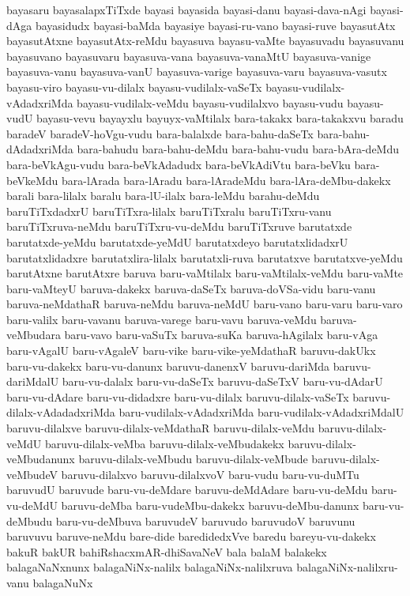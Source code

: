 {bayasaru
bayasalapxTiTxde
bayasi
bayasida
bayasi-danu
bayasi-dava-nAgi
bayasi-dAga
bayasidudx
bayasi-baMda
bayasiye
bayasi-ru-vano
bayasi-ruve
bayasutAtx
bayasutAtxne
bayasutAtx-reMdu
bayasuva
bayasu-vaMte
bayasuvadu
bayasuvanu
bayasuvano
bayasuvaru
bayasuva-vana
bayasuva-vanaMtU
bayasuva-vanige
bayasuva-vanu
bayasuva-vanU
bayasuva-varige
bayasuva-varu
bayasuva-vasutx
bayasu-viro
bayasu-vu-dilalx
bayasu-vudilalx-vaSeTx
bayasu-vudilalx-vAdadxriMda
bayasu-vudilalx-veMdu
bayasu-vudilalxvo
bayasu-vudu
bayasu-vudU
bayasu-vevu
bayayxlu
bayuyx-vaMtilalx
bara-takakx
bara-takakxvu
baradu
baradeV
baradeV-hoVgu-vudu
bara-balalxde
bara-bahu-daSeTx
bara-bahu-dAdadxriMda
bara-bahudu
bara-bahu-deMdu
bara-bahu-vudu
bara-bAra-deMdu
bara-beVkAgu-vudu
bara-beVkAdadudx
bara-beVkAdiVtu
bara-beVku
bara-beVkeMdu
bara-lArada
bara-lAradu
bara-lAradeMdu
bara-lAra-deMbu-dakekx
barali
bara-lilalx
baralu
bara-lU-ilalx
bara-leMdu
barahu-deMdu
baruTiTxdadxrU
baruTiTxra-lilalx
baruTiTxralu
baruTiTxru-vanu
baruTiTxruva-neMdu
baruTiTxru-vu-deMdu
baruTiTxruve
barutatxde
barutatxde-yeMdu
barutatxde-yeMdU
barutatxdeyo
barutatxlidadxrU
barutatxlidadxre
barutatxlira-lilalx
barutatxli-ruva
barutatxve
barutatxve-yeMdu
barutAtxne
barutAtxre
baruva
baru-vaMtilalx
baru-vaMtilalx-veMdu
baru-vaMte
baru-vaMteyU
baruva-dakekx
baruva-daSeTx
baruva-doVSa-vidu
baru-vanu
baruva-neMdathaR
baruva-neMdu
baruva-neMdU
baru-vano
baru-varu
baru-varo
baru-valilx
baru-vavanu
baruva-varege
baru-vavu
baruva-veMdu
baruva-veMbudara
baru-vavo
baru-vaSuTx
baruva-suKa
baruva-hAgilalx
baru-vAga
baru-vAgalU
baru-vAgaleV
baru-vike
baru-vike-yeMdathaR
baruvu-dakUkx
baru-vu-dakekx
baru-vu-danunx
baruvu-danenxV
baruvu-dariMda
baruvu-dariMdalU
baru-vu-dalalx
baru-vu-daSeTx
baruvu-daSeTxV
baru-vu-dAdarU
baru-vu-dAdare
baru-vu-didadxre
baru-vu-dilalx
baruvu-dilalx-vaSeTx
baruvu-dilalx-vAdadadxriMda
baru-vudilalx-vAdadxriMda
baru-vudilalx-vAdadxriMdalU
baruvu-dilalxve
baruvu-dilalx-veMdathaR
baruvu-dilalx-veMdu
baruvu-dilalx-veMdU
baruvu-dilalx-veMba
baruvu-dilalx-veMbudakekx
baruvu-dilalx-veMbudanunx
baruvu-dilalx-veMbudu
baruvu-dilalx-veMbude
baruvu-dilalx-veMbudeV
baruvu-dilalxvo
baruvu-dilalxvoV
baru-vudu
baru-vu-duMTu
baruvudU
baruvude
baru-vu-deMdare
baruvu-deMdAdare
baru-vu-deMdu
baru-vu-deMdU
baruvu-deMba
baru-vudeMbu-dakekx
baruvu-deMbu-danunx
baru-vu-deMbudu
baru-vu-deMbuva
baruvudeV
baruvudo
baruvudoV
baruvunu
baruvuvu
baruve-neMdu
bare-dide
baredidedxVve
baredu
bareyu-vu-dakekx
bakuR
bakUR
bahiRshacxmAR-dhiSavaNeV
bala
balaM
balakekx
balagaNaNxnunx
balagaNiNx-nalilx
balagaNiNx-nalilxruva
balagaNiNx-nalilxru-vanu
balagaNuNx
}
